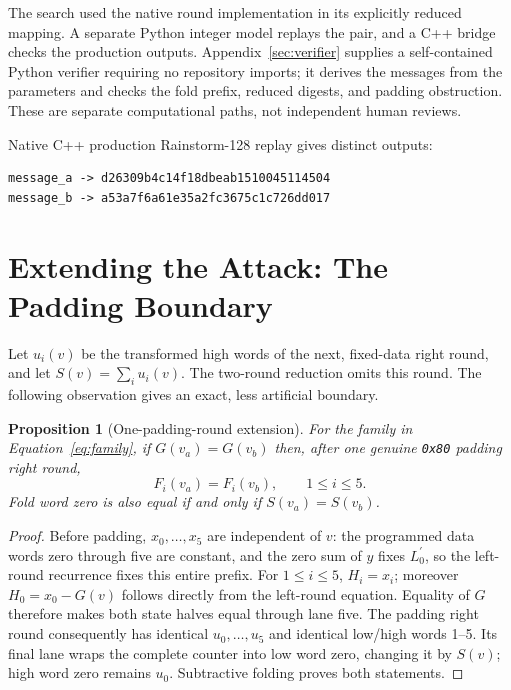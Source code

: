 \documentclass[10pt]{article}
\newtheorem{proposition}{Proposition}
\theoremstyle{definition}
\newcommand{\code}[1]{\texttt{#1}}
\begin{document}
The search used the native round implementation in its explicitly reduced mapping. A separate Python integer model replays the pair, and a C++ bridge checks the production outputs. Appendix~\ref{sec:verifier} supplies a self-contained Python verifier requiring no repository imports; it derives the messages from the parameters and checks the fold prefix, reduced digests, and padding obstruction. These are separate computational paths, not independent human reviews.

Native C++ production Rainstorm-128 replay gives distinct outputs:
\begin{lstlisting}[style=code]
message_a -> d26309b4c14f18dbeab1510045114504
message_b -> a53a7f6a61e35a2fc3675c1c726dd017
\end{lstlisting}

\section{Extending the Attack: The Padding Boundary}
\label{sec:padding}

Let $u_i(v)$ be the transformed high words of the next, fixed-data right round, and let $S(v)=\sum_i u_i(v)$.  The two-round reduction omits this round.  The following observation gives an exact, less artificial boundary.

\begin{proposition}[One-padding-round extension]\label{prop:padding}
For the family in Equation~\eqref{eq:family}, if $G(v_a)=G(v_b)$ then, after one genuine \code{0x80} padding right round,
\[
 F_i(v_a)=F_i(v_b),\qquad 1\leq i\leq5.
\]
Fold word zero is also equal if and only if $S(v_a)=S(v_b)$.
\end{proposition}

\begin{proof}
Before padding, $x_0,\ldots,x_5$ are independent of $v$: the programmed data words zero through five are constant, and the zero sum of $y$ fixes $L^{\prime}_0$, so the left-round recurrence fixes this entire prefix.  For $1\leq i\leq5$, $H_i=x_i$; moreover $H_0=x_0-G(v)$ follows directly from the left-round equation.  Equality of $G$ therefore makes both state halves equal through lane five.  The padding right round consequently has identical $u_0,\ldots,u_5$ and identical low/high words 1--5.  Its final lane wraps the complete counter into low word zero, changing it by $S(v)$; high word zero remains $u_0$.  Subtractive folding proves both statements.
\end{proof}
\end{document}
